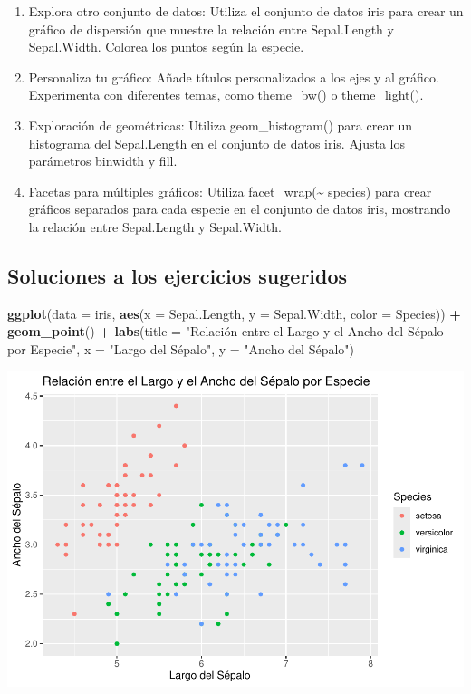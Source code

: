 \documentclass[
]{book}
\newenvironment{Shaded}{\begin{snugshade}}{\end{snugshade}}
\newcommand{\AttributeTok}[1]{\textcolor[rgb]{0.13,0.29,0.53}{#1}}
\newcommand{\FunctionTok}[1]{\textcolor[rgb]{0.13,0.29,0.53}{\textbf{#1}}}
\newcommand{\NormalTok}[1]{#1}
\newcommand{\SpecialCharTok}[1]{\textcolor[rgb]{0.81,0.36,0.00}{\textbf{#1}}}
\newcommand{\StringTok}[1]{\textcolor[rgb]{0.31,0.60,0.02}{#1}}
\providecommand{\tightlist}{%
  \setlength{\itemsep}{0pt}\setlength{\parskip}{0pt}}
\begin{document}
\begin{enumerate}
\def\labelenumi{\arabic{enumi}.}
\tightlist
\item
  Explora otro conjunto de datos: Utiliza el conjunto de datos iris para crear un gráfico de dispersión que muestre la relación entre Sepal.Length y Sepal.Width. Colorea los puntos según la especie.
\item
  Personaliza tu gráfico: Añade títulos personalizados a los ejes y al gráfico. Experimenta con diferentes temas, como theme\_bw() o theme\_light().
\item
  Exploración de geométricas: Utiliza geom\_histogram() para crear un histograma del Sepal.Length en el conjunto de datos iris. Ajusta los parámetros binwidth y fill.
\item
  Facetas para múltiples gráficos: Utiliza facet\_wrap(\textasciitilde{} species) para crear gráficos separados para cada especie en el conjunto de datos iris, mostrando la relación entre Sepal.Length y Sepal.Width.
\end{enumerate}

\subsection{Soluciones a los ejercicios sugeridos}\label{soluciones-a-los-ejercicios-sugeridos}

\begin{Shaded}
\begin{Highlighting}[]
\FunctionTok{ggplot}\NormalTok{(}\AttributeTok{data =}\NormalTok{ iris, }\FunctionTok{aes}\NormalTok{(}\AttributeTok{x =}\NormalTok{ Sepal.Length, }\AttributeTok{y =}\NormalTok{ Sepal.Width, }\AttributeTok{color =}\NormalTok{ Species)) }\SpecialCharTok{+} 
  \FunctionTok{geom\_point}\NormalTok{() }\SpecialCharTok{+}
  \FunctionTok{labs}\NormalTok{(}\AttributeTok{title =} \StringTok{"Relación entre el Largo y el Ancho del Sépalo por Especie"}\NormalTok{,}
       \AttributeTok{x =} \StringTok{"Largo del Sépalo"}\NormalTok{,}
       \AttributeTok{y =} \StringTok{"Ancho del Sépalo"}\NormalTok{)}
\end{Highlighting}
\end{Shaded}

\includegraphics{bookdown-demo_files/figure-latex/unnamed-chunk-178-1.pdf}
\end{document}
